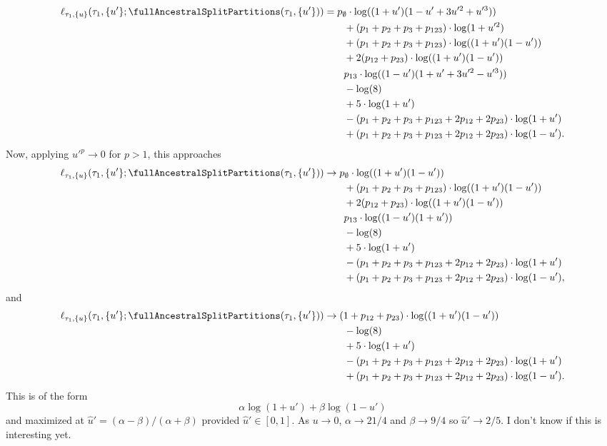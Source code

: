 \begin{align*}
    \ell_{\tau_1,\{u\}}(\tau_1, \{u'\}; \fullAncestralSplitPartitions(\tau_1,\{u'\}))
    &=        p_{\emptyset}  \cdot\log((1+u')(1-u'+3u'^2+u'^3))\\
    &\qquad + (p_{1}+p_{2}+p_{3}+p_{123})          \cdot\log(1+u'^2) \\
    &\qquad + (p_{1}+p_{2}+p_{3}+p_{123})          \cdot\log((1+u')(1-u')) \\
    &\qquad + 2(p_{12}+p_{23})         \cdot\log((1+u')(1-u')) \\
    &\qquad   p_{13}  \cdot\log((1-u')(1+u'+3u'^2-u'^3))\\
    &\qquad - \log(8) \\
    &\qquad + 5\cdot\log(1+u')\\
    &\qquad - (p_{1}+p_{2}+p_{3}+p_{123}+2p_{12}+2p_{23})\cdot\log(1+u') \\
    &\qquad + (p_{1}+p_{2}+p_{3}+p_{123}+2p_{12}+2p_{23})\cdot\log(1-u').
\end{align*}
Now, applying $u'^p\rightarrow 0$ for $p > 1$, this approaches
\begin{align*}
    \ell_{\tau_1,\{u\}}(\tau_1, \{u'\}; \fullAncestralSplitPartitions(\tau_1,\{u'\}))
    &\rightarrow        p_{\emptyset}  \cdot\log((1+u')(1-u'))\\
    &\qquad + (p_{1}+p_{2}+p_{3}+p_{123})          \cdot\log((1+u')(1-u')) \\
    &\qquad + 2(p_{12}+p_{23})         \cdot\log((1+u')(1-u')) \\
    &\qquad   p_{13}  \cdot\log((1-u')(1+u'))\\
    &\qquad - \log(8) \\
    &\qquad + 5\cdot\log(1+u')\\
    &\qquad - (p_{1}+p_{2}+p_{3}+p_{123}+2p_{12}+2p_{23})\cdot\log(1+u') \\
    &\qquad + (p_{1}+p_{2}+p_{3}+p_{123}+2p_{12}+2p_{23})\cdot\log(1-u'),
\end{align*}
and
\begin{align*}
    \ell_{\tau_1,\{u\}}(\tau_1, \{u'\}; \fullAncestralSplitPartitions(\tau_1,\{u'\}))
    &\rightarrow (1+p_{12}+p_{23})\cdot\log((1+u')(1-u'))\\
    &\qquad - \log(8) \\
    &\qquad + 5\cdot\log(1+u')\\
    &\qquad - (p_{1}+p_{2}+p_{3}+p_{123}+2p_{12}+2p_{23})\cdot\log(1+u') \\
    &\qquad + (p_{1}+p_{2}+p_{3}+p_{123}+2p_{12}+2p_{23})\cdot\log(1-u').
\end{align*}
This is of the form
$$
\alpha\log(1+u') + \beta\log(1-u')
$$
and maximized at $\hat{u}' = (\alpha - \beta) / (\alpha + \beta)$ provided $\hat{u}' \in [0,1]$.
As $u\rightarrow 0$, $\alpha\rightarrow 21/4$ and $\beta\rightarrow 9/4$ so $\hat{u}'\rightarrow 2/5.$
I don't know if this is interesting yet.

